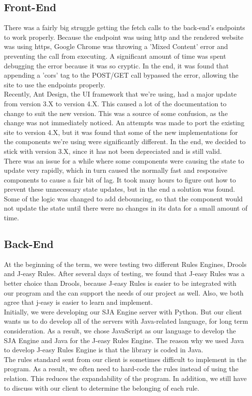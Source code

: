 \documentclass[onecolumn, draftclsnofoot,10pt, compsoc]{IEEEtran}
\begin{document}
\subsection{Front-End}
There was a fairly big struggle getting the fetch calls to the back-end's endpoints to work properly. Because the endpoint was using http and the rendered website was using https, Google Chrome was throwing a 'Mixed Content' error and preventing the call from executing. A significant amount of time was spent debugging the error because it was so cryptic. In the end, it was found that appending a 'cors' tag to the POST/GET call bypassed the error, allowing the site to use the endpoints properly.\\[10pt]
Recently, Ant Design, the UI framework that we're using, had a major update from version 3.X to version 4.X. This caused a lot of the documentation to change to suit the new version. This was a source of some confusion, as the change was not immediately noticed. An attempts was made to port the existing site to version 4.X, but it was found that some of the new implementations for the components we're using were significantly different. In the end, we decided to stick with version 3.X, since it has not been depreciated and is still valid.\\[10pt]
There was an issue for a while where some components were causing the state to update very rapidly, which in turn caused the normally fast and responsive components to cause a fair bit of lag. It took many hours to figure out how to prevent these unnecessary state updates, but in the end a solution was found. Some of the logic was changed to add debouncing, so that the component would not update the state until there were no changes in its data for a small amount of time.

\subsection{Back-End}
At the beginning of the term, we were testing two different Rules Engines, Drools and J-easy Rules. After several days of testing, we found that J-easy Rules was a better choice than Drools, because J-easy Rules is easier to be integrated with our program and the can support the needs of our project as well. Also, we both agree that j-easy is easier to learn and implement.\\[10pt]
Initially, we were developing our SJA Engine server with Python. But our client wants us to do develop all of the servers with Java-related language, for long term consideration. As a result, we chose JavaScript as our language to develop the SJA Engine and Java for the J-easy Rules Engine. The reason why we used Java to develop J-easy Rules Engine is that the library is coded in Java. \\[10pt]
The rules standard sent from our client is sometimes difficult to implement in the program. As a result, we often need to hard-code the rules instead of using the relation. This reduces the expandability of the program. In addition, we still have to discuss with our client to determine the belonging of each rule. 
\end{document}

